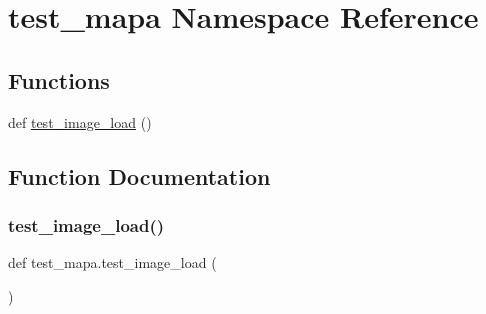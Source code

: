 \hypertarget{namespacetest__mapa}{}\section{test\+\_\+mapa Namespace Reference}
\label{namespacetest__mapa}
\subsection*{Functions}
\begin{DoxyCompactItemize}
\item 
def \hyperlink{namespacetest__mapa_ad8d6b939e4cbf40f48c4c0a3b8f3728e}{test\+\_\+image\+\_\+load} ()
\end{DoxyCompactItemize}


\subsection{Function Documentation}
\mbox{\label{namespacetest__mapa_ad8d6b939e4cbf40f48c4c0a3b8f3728e}} 
\subsubsection{\texorpdfstring{test\+\_\+image\+\_\+load()}{test\_image\_load()}}
{\footnotesize\ttfamily def test\+\_\+mapa.\+test\+\_\+image\+\_\+load (\begin{DoxyParamCaption}{ }\end{DoxyParamCaption})}

